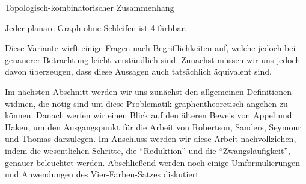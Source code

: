 \begin{section}{Topologisch-kombinatorischer Zusammenhang}
 \begin{satz}
  Jeder planare Graph ohne Schleifen ist 4-färbbar.
 \end{satz}
 
 Diese Variante wirft einige Fragen nach Begrifflichkeiten auf, welche jedoch bei genauerer Betrachtung leicht verständlich sind. Zunächst müssen wir uns jedoch davon überzeugen, dass diese Aussagen auch tatsächlich äquivalent sind.
 
 Im nächsten Abschnitt werden wir uns zunächst den allgemeinen Definitionen widmen, die nötig sind um diese Problematik graphentheoretisch angehen zu können. Danach werfen wir einen Blick auf den älteren Beweis von Appel und Haken, um den Ausgangspunkt für die Arbeit von Robertson, Sanders, Seymour und Thomas darzulegen. Im Anschluss werden wir diese Arbeit nachvollziehen, indem die wesentlichen Schritte, die ``Reduktion'' und die ``Zwangsläufigkeit'', genauer beleuchtet werden. Abschließend werden noch einige Umformulierungen und Anwendungen des Vier-Farben-Satzes diskutiert.
\end{section}
